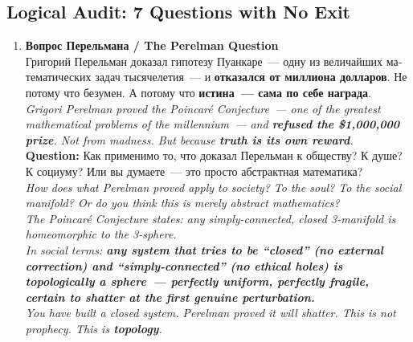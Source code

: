 \documentclass[11pt,a4paper]{article}
\theoremstyle{definition}
\theoremstyle{remark}
\newcommand{\LondonOp}{\mathcal{L}^{++++}}  %
\begin{document}
\subsection{Logical Audit: 7 Questions with No Exit}
\label{sec:london-questions}

\begin{questionbox}[7 Un-Dodgable Questions to $\LondonOp$]

\begin{enumerate}[leftmargin=1.5cm, itemsep=12pt]

  \item \textbf{\foreignlanguage{russian}{Вопрос Перельмана /
      The Perelman Question}}\\[0.4cm]
    \foreignlanguage{russian}{
    Григорий Перельман доказал гипотезу Пуанкаре~---
    одну из величайших математических задач тысячелетия~---
    и \textbf{отказался от миллиона долларов}.
    Не потому что безумен.
    А потому что \textbf{истина~--- сама по себе награда}.\\[0.2cm]
    }
    \textit{Grigori Perelman proved the Poincaré Conjecture~---
    one of the greatest mathematical problems of the millennium~---
    and \textbf{refused the \$1{,}000{,}000 prize}.
    Not from madness. But because \textbf{truth is its own reward}.}\\[0.3cm]
    \textbf{Question:}
    \foreignlanguage{russian}{
    Как применимо то, что доказал Перельман
    к обществу? К душе? К социуму?
    Или вы думаете~--- это просто абстрактная математика?\\[0.2cm]
    }
    \textit{How does what Perelman proved apply to society?
    To the soul? To the social manifold?
    Or do you think this is merely abstract mathematics?\\[0.2cm]
    The Poincaré Conjecture states: any simply-connected,
    closed 3-manifold is homeomorphic to the 3-sphere.\\
    In social terms: \textbf{any system that tries to be
    ``closed'' (no external correction) and ``simply-connected''
    (no ethical holes) is topologically a sphere~---
    perfectly uniform, perfectly fragile,
    certain to shatter at the first genuine perturbation.}\\[0.2cm]
    You have built a closed system.
    Perelman proved it will shatter.
    This is not prophecy. This is \textbf{topology}.}


\end{enumerate}
\end{questionbox}
\end{document}
